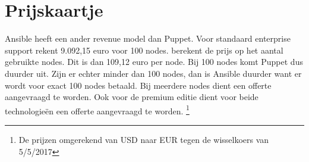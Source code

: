  \section{Prijskaartje}

Ansible heeft een ander revenue model dan Puppet. Voor standaard enterprise support rekent \textcite{ansibleprice} 9.092,15 euro voor 100 nodes. \textcite{puppetprice} berekent de prijs op het aantal gebruikte nodes. Dit is dan 109,12 euro per node. Bij 100 nodes komt Puppet dus duurder uit. Zijn er echter minder dan 100 nodes, dan is Ansible duurder want er wordt voor exact 100 nodes betaald. Bij meerdere nodes dient een offerte aangevraagd te worden. Ook voor de premium editie dient voor beide technologie\"en een offerte aangevraagd te worden. \footnote{De prijzen omgerekend van USD naar EUR tegen de wisselkoers van 5/5/2017}

